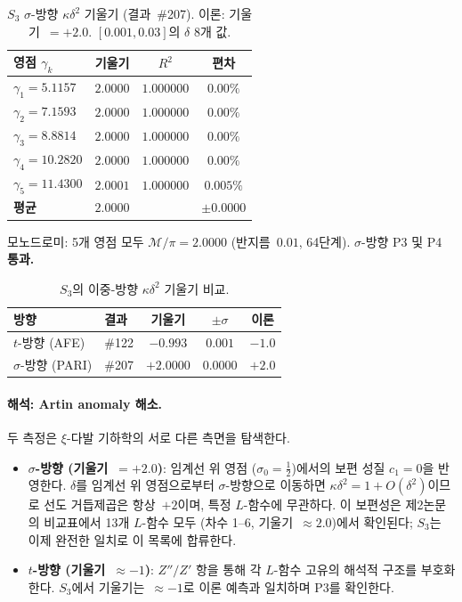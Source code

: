 \documentclass[11pt, a4paper]{article}
\theoremstyle{plain}
\theoremstyle{definition}
\newcommand{\kap}{\kappa}             %
\newcommand{\mono}{\mathcal{M}}       %
\begin{document}
\begin{table}[ht]
\centering
\caption{$S_{3}$ $\sigma$-방향 $\kap\delta^{2}$ 기울기 (결과~\#207).
  이론: 기울기~$=+2.0$. $[0.001,0.03]$의 $\delta$ 8개 값.}
\label{tab:s3-sigma}
\begin{tabular}{@{}lccc@{}}
\toprule
\textbf{영점 $\gamma_{k}$} & \textbf{기울기} & $R^{2}$ & \textbf{편차} \\
\midrule
$\gamma_{1}=5.1157$ & $2.0000$ & $1.000000$ & $0.00\%$ \\
$\gamma_{2}=7.1593$ & $2.0000$ & $1.000000$ & $0.00\%$ \\
$\gamma_{3}=8.8814$ & $2.0000$ & $1.000000$ & $0.00\%$ \\
$\gamma_{4}=10.2820$ & $2.0000$ & $1.000000$ & $0.00\%$ \\
$\gamma_{5}=11.4300$ & $2.0001$ & $1.000000$ & $0.005\%$ \\
\midrule
\textbf{평균} & $\bm{2.0000}$ & & $\pm\bm{0.0000}$ \\
\bottomrule
\end{tabular}
\end{table}

모노드로미: 5개 영점 모두 $\mono/\pi=2.0000$ (반지름~$0.01$, 64단계).
$\sigma$-방향 P3 및 P4 \textbf{통과.}

\begin{table}[ht]
\centering
\caption{$S_{3}$의 이중-방향 $\kap\delta^{2}$ 기울기 비교.}
\label{tab:s3-twodir}
\begin{tabular}{@{}llccc@{}}
\toprule
\textbf{방향} & \textbf{결과} & \textbf{기울기} & $\pm\sigma$ & \textbf{이론} \\
\midrule
$t$-방향 (AFE) & \#122 & $-0.993$ & $0.001$ & $-1.0$ \\
$\sigma$-방향 (PARI) & \#207 & $+2.0000$ & $0.0000$ & $+2.0$ \\
\bottomrule
\end{tabular}
\end{table}

\paragraph{해석: Artin anomaly 해소.}
두 측정은 $\xi$-다발 기하학의 서로 다른 측면을 탐색한다.

\begin{itemize}
  \item \textbf{$\sigma$-방향 (기울기~$=+2.0$)}: 임계선 위 영점
    ($\sigma_{0}=\tfrac{1}{2}$)에서의 보편 성질 $c_{1}=0$을 반영한다.
    $\delta$를 임계선 위 영점으로부터 $\sigma$-방향으로 이동하면
    $\kap\delta^{2}=1+O(\delta^{2})$이므로 선도 거듭제곱은 항상~$+2$이며,
    특정 $L$-함수에 무관하다.
    이 보편성은 제2논문의 비교표에서 13개 $L$-함수 모두
    (차수 1--6, 기울기~$\approx 2.0$)에서 확인된다;
    $S_{3}$는 이제 완전한 일치로 이 목록에 합류한다.
  \item \textbf{$t$-방향 (기울기~$\approx{-1}$)}: $Z''/Z'$ 항을 통해
    각 $L$-함수 고유의 해석적 구조를 부호화한다.
    $S_{3}$에서 기울기는~$\approx{-1}$로 이론 예측과 일치하며 P3를 확인한다.
\end{itemize}
\end{document}
